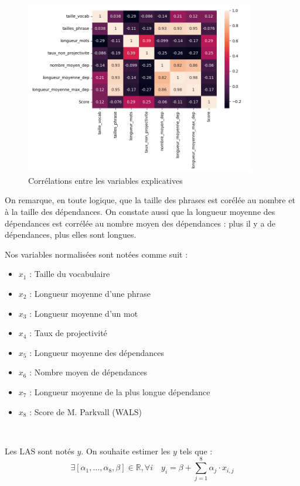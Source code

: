 \documentclass[a4paper, twoside, 12pt]{article}
\begin{document}
    \begin{figure}[!h]
        \centering
        \includegraphics[width = 0.9\textwidth]{images/heatmap}
        \caption{Corrélations entre les variables explicatives}
        \label{fig:heatmap}
    \end{figure}

    \FloatBarrier

    On remarque, en toute logique, que la taille des phrases est corélée au nombre et à la taille des dépendances. On constate aussi que la longueur moyenne des dépendances est corrélée au nombre moyen des dépendances : plus il y a de dépendances, plus elles sont longues.

Nos variables normalisées sont notées comme suit :
    \begin{itemize}
        \item $x_1$ : Taille du vocabulaire
        \item $x_2$ : Longueur moyenne d'une phrase
        \item $x_3$ : Longueur moyenne d'un mot
        \item $x_4$ : Taux de projectivité
        \item $x_5$ : Longueur moyenne des dépendances
        \item $x_6$ : Nombre moyen de dépendances
        \item $x_7$ : Longueur moyenne de la plus longue dépendance
        \item $x_8$ : Score de M. Parkvall (WALS)
    \end{itemize} ~ \par

    Les LAS sont notés $y$. On souhaite estimer les $y$ tels que :
    \begin{equation*}
        \exists \left[\alpha_1,\ldots,\alpha_8,\beta\right] \in \mathbb{R},\forall i \quad y_i = \beta + \sum_{j=1}^{8} \alpha_j \cdot x_{i,j}
        \end{equation*}
\end{document}
